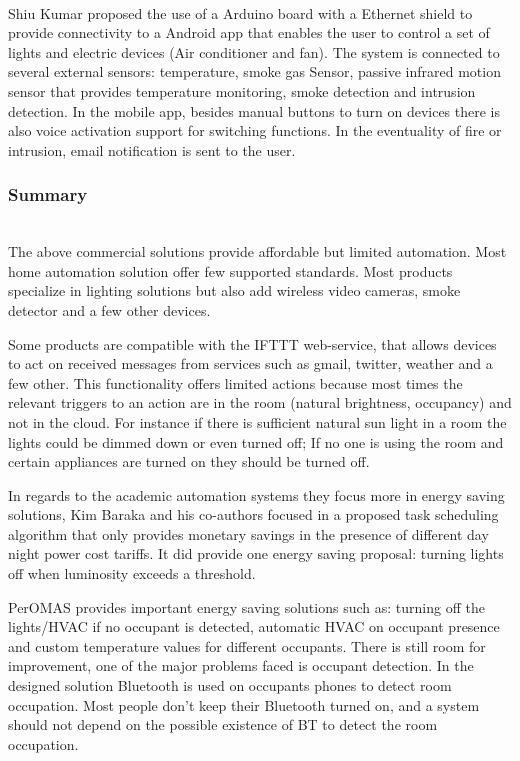 \mbox{}\\
Shiu Kumar proposed the use of a Arduino board with a Ethernet shield to provide connectivity to a Android app that enables the user to control a set of lights and electric devices (Air conditioner and fan)\cite{academic3}. The system is connected to several external sensors: temperature, smoke gas Sensor, passive infrared motion sensor that provides temperature monitoring, smoke detection and intrusion detection.
In the mobile app, besides manual buttons to turn on devices there is also voice activation support for switching functions. In the eventuality of fire or intrusion, email notification is sent to the user.


\subsubsection{Summary}\mbox{}\\

The above commercial solutions provide affordable but limited automation. Most home automation solution offer few supported standards. Most products specialize in lighting solutions but also add wireless video cameras, smoke detector and a few other devices. 

Some products are compatible with the IFTTT web-service, that allows devices to act on received messages from services such as gmail, twitter, weather and a few other. This functionality offers limited actions because most times the relevant triggers to an action are in the room (natural brightness, occupancy) and not in the cloud. For instance if there is sufficient natural sun light in a room the lights could be dimmed down or even turned off; If no one is using the room and certain appliances are turned on they should be turned off. 

In regards to the academic automation systems they focus more in energy saving  solutions, Kim Baraka and his co-authors\cite{academic:arduino1} focused in a proposed task scheduling algorithm that only provides monetary savings in the presence of different day night power cost tariffs. It did provide one energy saving proposal: turning lights off when luminosity exceeds a threshold.

PerOMAS\cite{peromas} provides important energy saving solutions such as: turning off the lights/HVAC if no occupant is detected, automatic HVAC on occupant presence and custom temperature values for different occupants. There is still room for improvement, one of the major problems faced is occupant detection. In the designed solution Bluetooth is used on occupants phones to detect room occupation. Most people don't keep their Bluetooth turned on, and a system should not depend on the possible existence of BT to detect the room occupation. 

